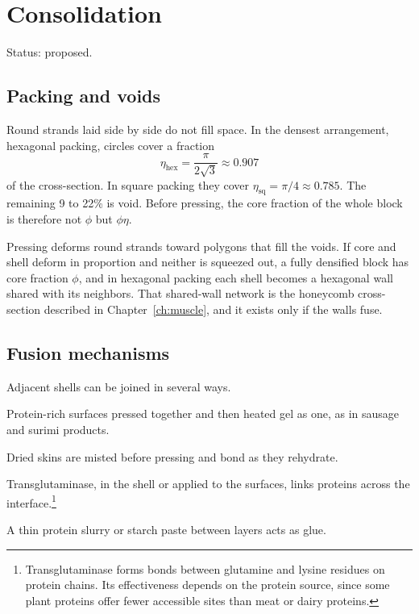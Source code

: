 \documentclass[11pt,openany]{book}
\theoremstyle{definition}
\begin{document}
\chapter{Consolidation}\label{ch:consolidation}

Status: proposed.

\section{Packing and voids}

Round strands laid side by side do not fill space. In the densest arrangement, hexagonal packing, circles cover a fraction
\[
\eta_{\text{hex}} = \frac{\pi}{2\sqrt{3}} \approx 0.907
\]
of the cross-section. In square packing they cover $\eta_{\text{sq}} = \pi/4 \approx 0.785$. The remaining 9 to 22\% is void. Before pressing, the core fraction of the whole block is therefore not $\phi$ but $\phi\eta$.

Pressing deforms round strands toward polygons that fill the voids. If core and shell deform in proportion and neither is squeezed out, a fully densified block has core fraction $\phi$, and in hexagonal packing each shell becomes a hexagonal wall shared with its neighbors. That shared-wall network is the honeycomb cross-section described in Chapter~\ref{ch:muscle}, and it exists only if the walls fuse.

\section{Fusion mechanisms}

Adjacent shells can be joined in several ways.

\begin{description}[leftmargin=1.5em]
\item[Co-gelation.] Protein-rich surfaces pressed together and then heated gel as one, as in sausage and surimi products.
\item[Remoistening.] Dried skins are misted before pressing and bond as they rehydrate.
\item[Enzymatic cross-linking.] Transglutaminase, in the shell or applied to the surfaces, links proteins across the interface.\footnote{Transglutaminase forms bonds between glutamine and lysine residues on protein chains. Its effectiveness depends on the protein source, since some plant proteins offer fewer accessible sites than meat or dairy proteins.}
\item[Binders.] A thin protein slurry or starch paste between layers acts as glue.
\end{description}
\end{document}
